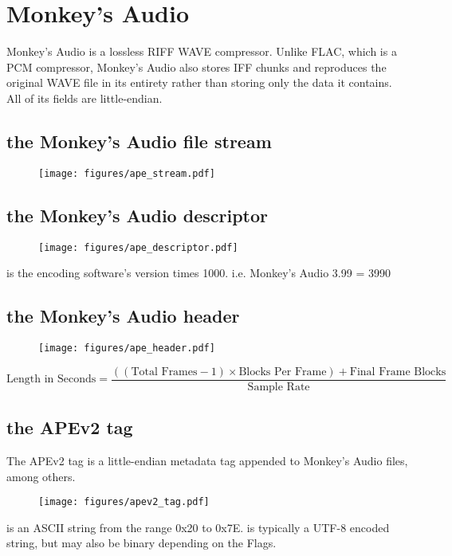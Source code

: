 
\chapter{Monkey's Audio}
Monkey's Audio is a lossless RIFF WAVE compressor.
Unlike FLAC, which is a PCM compressor, Monkey's Audio also stores
IFF chunks and reproduces the original WAVE file in its entirety rather
than storing only the data it contains.
All of its fields are little-endian.

\section{the Monkey's Audio file stream}
\begin{figure}[h]
\texttt{[image: figures/ape\_stream.pdf]}
\end{figure}

\section{the Monkey's Audio descriptor}
\begin{figure}[h]
\texttt{[image: figures/ape\_descriptor.pdf]}
\end{figure}
\par
\noindent
{} is the encoding software's version times 1000.
i.e. Monkey's Audio 3.99 = 3990

\section{the Monkey's Audio header}
\begin{figure}[h]
\texttt{[image: figures/ape\_header.pdf]}
\end{figure}
{
\begin{equation}
\text{Length in Seconds} = \frac{((\text{Total Frames} - 1) \times \text{Blocks Per Frame}) + \text{Final Frame Blocks}}{\text{Sample Rate}}
\end{equation}
}
\section{the APEv2 tag}
\label{apev2}
The APEv2 tag is a little-endian metadata tag appended to
Monkey's Audio files, among others.
\begin{figure}[h]
\texttt{[image: figures/apev2\_tag.pdf]}
\end{figure}
\par
\noindent
{} is an ASCII string from the range 0x20 to 0x7E.
 is typically a UTF-8 encoded string, but may
also be binary depending on the Flags.


